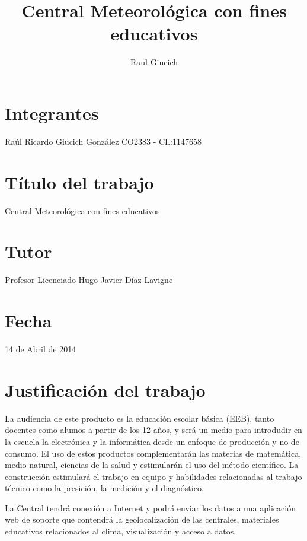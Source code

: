 \documentclass[a4paper,11pt, spanish]{article}
\title{Central Meteorológica con fines educativos}
\author{Raul Giucich}
\begin{document}
\section{Integrantes}
Raúl Ricardo Giucich González
CO2383 - CI.:1147658

\section{Título del trabajo}
Central Meteorológica con fines educativos

\section{Tutor}
Profesor Licenciado Hugo Javier Díaz Lavigne

\section{Fecha}
14 de Abril de 2014

\section{Justificación del trabajo}
La audiencia de este producto es la educación escolar básica (EEB), tanto docentes como alumos a partir de los 12 años, y será un medio para introdudir en la escuela la electrónica y la informática desde un enfoque de producción y no de consumo. El uso de estos productos complementarán las materias de matemática, medio natural, ciencias de la salud y estimularán el uso del método científico. La construcción estimulará el trabajo en equipo y habilidades relacionadas al trabajo técnico como la presición, la medición y el diagnóstico.

La Central tendrá conexión a Internet y podrá enviar los datos a una aplicación web de soporte que contendrá la geolocalización de las centrales, materiales educativos relacionados al clima, visualización y acceso a datos.
\end{document}
